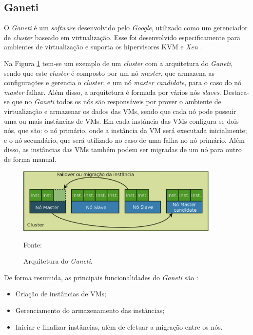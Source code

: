 \subsection{Ganeti}
\label{section:ganeti}
O \textit{Ganeti} \cite{ganeti} é um \textit{software} desenvolvido pelo \textit{Google}, utilizado como um gerenciador de \textit{cluster} 
baseado em virtualização. Esse foi desenvolvido especificamente para ambientes de virtualização e suporta os hipervisores 
\ac{KVM} \cite{kvm} e \textit{Xen} \cite{xen}. 

Na Figura \ref{fig:ganeti_arquitetura} tem-se um exemplo de um \textit{cluster} com a arquitetura do \textit{Ganeti}, sendo que este 
\textit{cluster} é composto por um nó \textit{master}, que armazena as configurações e gerencia o \textit{cluster}, e um nó 
\textit{master candidate}, para o caso do nó \textit{master} falhar. Além disso, a arquitetura é formada por vários nós \textit{slaves}. 
Destaca-se que no \textit{Ganeti} todos os nós são responsáveis por prover o ambiente de virtualização e armazenar os dados das \acp{VM}, 
sendo que cada nó pode possuir uma ou mais instâncias de \acp{VM}. Em cada instância das \acp{VM} configura-se dois nós, que são: o nó primário, 
onde a instância da \ac{VM} será executada inicialmente; e o nó secundário, que será utilizado no caso de uma falha no nó primário.
Além disso, as instâncias das \acp{VM} também podem ser migradas de um nó para outro de forma manual. 

\begin{figure}[h!]
 \centering
 \includegraphics[width=380px]{img/ganeti_arquitetura.eps}
 \caption{Arquitetura do \textit{Ganeti}.}
 Fonte: \citet{carvalho2011}
 \label{fig:ganeti_arquitetura}
\end{figure}

De forma resumida, as principais funcionalidades do \textit{Ganeti} são \cite{ganeti}:
\begin{itemize}
 \item Criação de instâncias de \acp{VM};
 \item Gerenciamento do armazenamento das instâncias;
 \item Iniciar e finalizar instâncias, além de efetuar a migração entre os nós.
\end{itemize}

